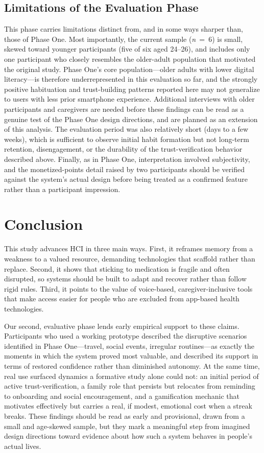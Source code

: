 \documentclass[acmlarge]{acmart}
\begin{document}
\subsection{Limitations of the Evaluation Phase}
\label{sec:phase2-limitations}
This phase carries limitations distinct from, and in some ways sharper
than, those of Phase One. Most importantly, the current sample
(\emph{n}~=~6) is small, skewed toward younger participants (five of six
aged 24--26), and includes only one participant who closely resembles the
older-adult population that motivated the original study. Phase One's
core population---older adults with lower digital literacy---is therefore
underrepresented in this evaluation so far, and the strongly positive
habituation and trust-building patterns reported here may not generalize
to users with less prior smartphone experience. Additional interviews with
older participants and caregivers are needed before these findings can be
read as a genuine test of the Phase One design directions, and are planned
as an extension of this analysis. The evaluation period was also relatively
short (days to a few weeks), which is sufficient to observe initial habit
formation but not long-term retention, disengagement, or the durability of
the trust-verification behavior described above. Finally, as in Phase One,
interpretation involved subjectivity, and the monetized-points detail
raised by two participants should be verified against the system's actual
design before being treated as a confirmed feature rather than a
participant impression.

\section{Conclusion}
This study advances HCI in three main ways. First, it reframes memory
from a weakness to a valued resource, demanding technologies that
scaffold rather than replace. Second, it shows that sticking to
medication is fragile and often disrupted, so systems should be built to
adapt and recover rather than follow rigid rules. Third, it points to
the value of voice-based, caregiver-inclusive tools that make access
easier for people who are excluded from app-based health technologies.

Our second, evaluative phase lends early empirical support to these
claims. Participants who used a working prototype described the
disruptive scenarios identified in Phase One---travel, social events,
irregular routines---as exactly the moments in which the system proved
most valuable, and described its support in terms of restored confidence
rather than diminished autonomy. At the same time, real use surfaced
dynamics a formative study alone could not: an initial period of active
trust-verification, a family role that persists but relocates from
reminding to onboarding and social encouragement, and a gamification
mechanic that motivates effectively but carries a real, if modest,
emotional cost when a streak breaks. These findings should be read as
early and provisional, drawn from a small and age-skewed sample, but they
mark a meaningful step from imagined design directions toward evidence
about how such a system behaves in people's actual lives.
\end{document}
